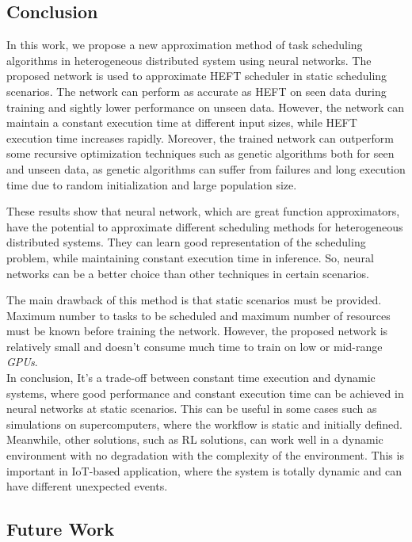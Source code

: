 \subsection{Conclusion}

In this work, we propose a new approximation method of task scheduling algorithms in heterogeneous distributed system using neural networks. The proposed network is used to approximate HEFT scheduler in static scheduling scenarios. The network can perform as accurate as HEFT on seen data during training and sightly lower performance on unseen data. However, the network can maintain a constant execution time at different input sizes, while HEFT execution time increases rapidly. Moreover, the trained network can outperform some recursive optimization techniques such as genetic algorithms both for seen and unseen data, as genetic algorithms can suffer from failures and long execution time due to random initialization and large population size.

These results show that neural network, which are great function approximators, have the potential to approximate different scheduling methods for heterogeneous distributed systems. They can learn good representation of the scheduling problem, while maintaining constant execution time in inference. So, neural networks can be a better choice than other techniques in certain scenarios. 

The main drawback of this method is that static scenarios must be provided. Maximum number to tasks to be scheduled and maximum number of resources must be known before training the network. However, the proposed network is relatively small and doesn't consume much time to train on low or mid-range \emph{GPUs}. \\

In conclusion, It's a trade-off between constant time execution and dynamic systems, where good performance and constant execution time can be achieved in neural networks at static scenarios. This can be useful in some cases such as simulations on supercomputers, where the workflow is static and initially defined. Meanwhile, other solutions, such as RL solutions, can work well in a dynamic environment with no degradation with the complexity of the environment. This is important in IoT-based application, where the system is totally dynamic and can have different unexpected events.

\subsection{Future Work}

